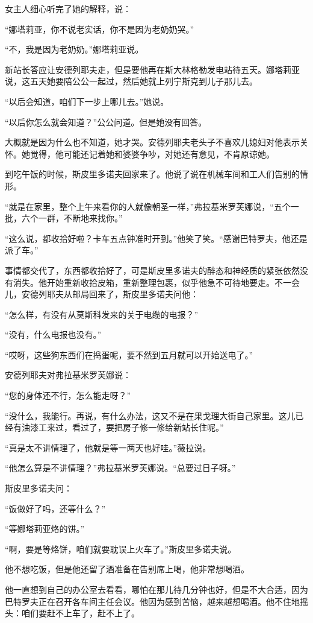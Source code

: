 女主人细心听完了她的解释，说：

“娜塔莉亚，你不说老实话，你不是因为老奶奶哭。”

“不，我是因为老奶奶。”娜塔莉亚说。

新站长答应让安德列耶夫走，但是要他再在斯大林格勒发电站待五天。娜塔莉亚说，这五天她要陪公公一起过，然后她就上列宁斯克到儿子那儿去。

“以后会知道，咱们下一步上哪儿去。”她说。

“以后你怎么就会知道？”公公问道。但是她没有回答。

大概就是因为什么也不知道，她才哭。安德列耶夫老头子不喜欢儿媳妇对他表示关怀。她觉得，他可能还记着她和婆婆争吵，对她还有意见，不肯原谅她。

到吃午饭的时候，斯皮里多诺夫回家来了。他说了说在机械车间和工人们告别的情形。

“就是在家里，整个上午来看你的人就像朝圣一样，”弗拉基米罗芙娜说，“五个一批，六个一群，不断地来找你。”

“这么说，都收拾好啦？卡车五点钟准时开到。”他笑了笑。“感谢巴特罗夫，他还是派了车。”

事情都交代了，东西都收拾好了，可是斯皮里多诺夫的醉态和神经质的紧张依然没有消失。他开始重新收拾皮箱，重新整理包裹，似乎他急不可待地要走。不一会儿，安德列耶夫从邮局回来了，斯皮里多诺夫问他：

“怎么样，有没有从莫斯科发来的关于电缆的电报？”

“没有，什么电报也没有。”

“哎呀，这些狗东西们在捣蛋呢，要不然到五月就可以开始送电了。”

安德列耶夫对弗拉基米罗芙娜说：

“您的身体还不行，怎么能走呀？”

“没什么，我能行。再说，有什么办法，这又不是在果戈理大街自己家里。这儿已经有油漆工来过，看过了，要把房子修一修给新站长住呢。”

“真是太不讲情理了，他就是等一两天也好哇。”薇拉说。

“他怎么算是不讲情理？”弗拉基米罗芙娜说。“总要过日子呀。”

斯皮里多诺夫问：

“饭做好了吗，还等什么？”

“等娜塔莉亚烙的饼。”

“啊，要是等烙饼，咱们就要耽误上火车了。”斯皮里多诺夫说。

他不想吃饭，但是他还留了酒准备在告别席上喝，他非常想喝酒。

他一直想到自己的办公室去看看，哪怕在那儿待几分钟也好，但是不大合适，因为巴特罗夫正在召开各车间主任会议。他因为感到苦恼，越来越想喝酒。他不住地摇头：咱们要赶不上车了，赶不上了。

